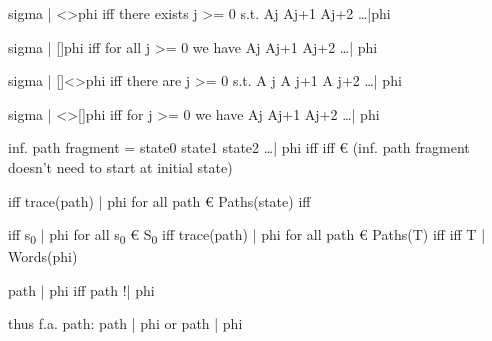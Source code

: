 \documentclass[landscape, a4paper]{article}
\begin{document}
\begin{minipage}[t]{0.195\linewidth}
\begin{betterlist}
		\item sigma |\raisebox{0.5mm}{=} <>phi iff there exists j >= 0 s.t. Aj Aj+1 Aj+2 \ldots |\raisebox{0.5mm}{=}phi
		\item sigma |\raisebox{0.5mm}{=} []phi iff for all j >= 0 we have Aj Aj+1 Aj+2 \ldots |\raisebox{0.5mm}{=} phi
		\item sigma |\raisebox{0.5mm}{=} []<>phi iff there are  j >= 0 s.t. A j A j+1 A j+2 \ldots |\raisebox{0.5mm}{=} phi
		\item sigma |\raisebox{0.5mm}{=} <>[]phi iff for  j >= 0 we have Aj Aj+1 Aj+2 \ldots |\raisebox{0.5mm}{=} phi
		\item inf. path fragment = state0 state1 state2  \ldots |\raisebox{0.4mm}{=} phi iff \raisebox{0.4mm}{=}  iff €  (inf. path fragment doesn't need to start at initial state)
		\item {}\raisebox{0.4mm}{=}  iff trace(path) |\raisebox{0.4mm}{=} phi for all path € Paths(state) iff \raisebox{0.3mm}{=} 
		\item {}\raisebox{0.4mm}{=}  iff s\textsubscript{0} |\raisebox{0.4mm}{=} phi for all s\textsubscript{0} € S\textsubscript{0} iff trace(path) |\raisebox{0.4mm}{=} phi for all path € Paths(T) iff \raisebox{0.3mm}{=} iff T |\raisebox{0.4mm}{=} Words(phi)
		\item path |\raisebox{0.4mm}{=} \raisebox{-0.4mm}{\~{}}phi iff path !|\raisebox{0.4mm}{=} phi
		\begin{betterlist}
			\item thus f.a. path: path |\raisebox{0.4mm}{=} phi or path |\raisebox{0.4mm}{=} \raisebox{-0.4mm}{\~{}}phi

\end{betterlist}
\end{betterlist}
\end{minipage}
\end{document}

